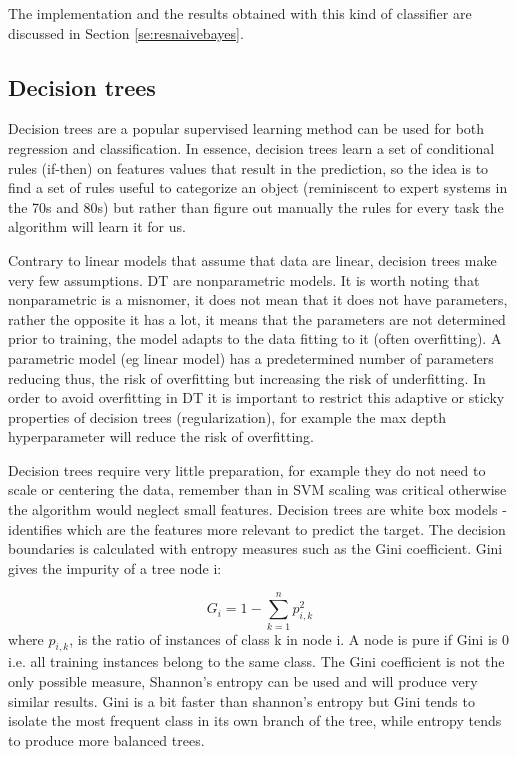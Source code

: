 \documentclass[11pt]{article}
\theoremstyle{definition}
\theoremstyle{remark}
\begin{document}
{The implementation and the results obtained with this kind of classifier are discussed in Section \ref{se:resnaivebayes}.

\subsection{Decision trees}
\label{sse:dectrees}
Decision trees are a popular supervised learning method can be used for both regression and classification.
In essence, decision trees learn a set of conditional rules (if-then) on features values that result in the prediction, so the idea is to find a set of rules useful to categorize an object (reminiscent to expert systems in the 70s and 80s) but rather than figure out manually the rules for every task the algorithm will learn it for us.

Contrary to linear models that assume that data are linear, decision trees make very few assumptions.
DT are nonparametric models. It is worth noting that nonparametric is a misnomer, it does not mean that it does not have parameters, rather the opposite it has a lot, it means that the parameters are not determined prior to training, the model adapts to the data fitting to it (often overfitting). A parametric model (eg linear model) has a predetermined number of parameters reducing thus, the risk of overfitting but increasing the risk of underfitting. In order to avoid overfitting in DT it is important to restrict this adaptive or sticky properties of decision trees (regularization), for example the max depth hyperparameter will reduce the risk of overfitting.

Decision trees require very little preparation, for example they do not need to scale or centering the data, remember than in SVM scaling was critical otherwise the algorithm would neglect small features.
Decision trees are white box models -identifies which are the features more relevant to predict the target.
The decision boundaries is calculated with entropy measures such as the Gini coefficient. Gini gives the impurity of a tree node i:

\begin{equation} \label{eq:gini}
G_i = 1- \sum_{k=1}^{n} p_{i,k}^2
\end{equation}
where $p_{i,k}$, is the ratio of instances of class k in node i. A node is pure if Gini is 0 i.e. all training instances belong to the same class. The Gini coefficient is not the only possible measure, Shannon's entropy can be used and will produce very similar results. Gini is a bit faster than shannon's entropy but Gini tends to isolate the most frequent class in its own branch of the tree, while entropy tends to produce more balanced trees. %

}
\end{document}
